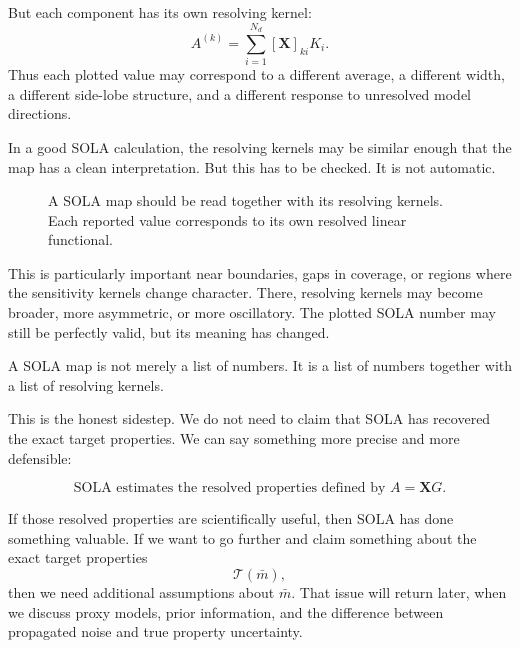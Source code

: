 \documentclass[11pt,openany]{book}
\theoremstyle{definition}
\theoremstyle{remark}
\newcommand{\Tau}{\mathcal{T}}
\begin{document}
But each component has its own resolving kernel:
\[
  A^{(k)}
  =
  \sum_{i=1}^{N_d}[\mathbf X]_{ki}K_i.
\]
Thus each plotted value may correspond to a different average, a different width, a different
side-lobe structure, and a different response to unresolved model directions.

In a good SOLA calculation, the resolving kernels may be similar enough that the map has a
clean interpretation. But this has to be checked. It is not automatic.

\begin{figure}[ht]
  \centering
  \caption{A SOLA map should be read together with its resolving kernels. Each reported value
  corresponds to its own resolved linear functional.}
  \label{fig:act6-map-with-resolving-kernels}
\end{figure}

This is particularly important near boundaries, gaps in coverage, or regions where the sensitivity
kernels change character. There, resolving kernels may become broader, more asymmetric, or
more oscillatory. The plotted SOLA number may still be perfectly valid, but its meaning has
changed.

\begin{checkpointbox}
A SOLA map is not merely a list of numbers. It is a list of numbers together with a list of
resolving kernels.
\end{checkpointbox}

This is the honest sidestep. We do not need to claim that SOLA has recovered the exact target
properties. We can say something more precise and more defensible:

\[
  \text{SOLA estimates the resolved properties defined by }A=\mathbf XG.
\]

If those resolved properties are scientifically useful, then SOLA has done something valuable.
If we want to go further and claim something about the exact target properties
\[
  \Tau(\bar m),
\]
then we need additional assumptions about \(\bar m\). That issue will return later, when we
discuss proxy models, prior information, and the difference between propagated noise and true
property uncertainty.
\end{document}
